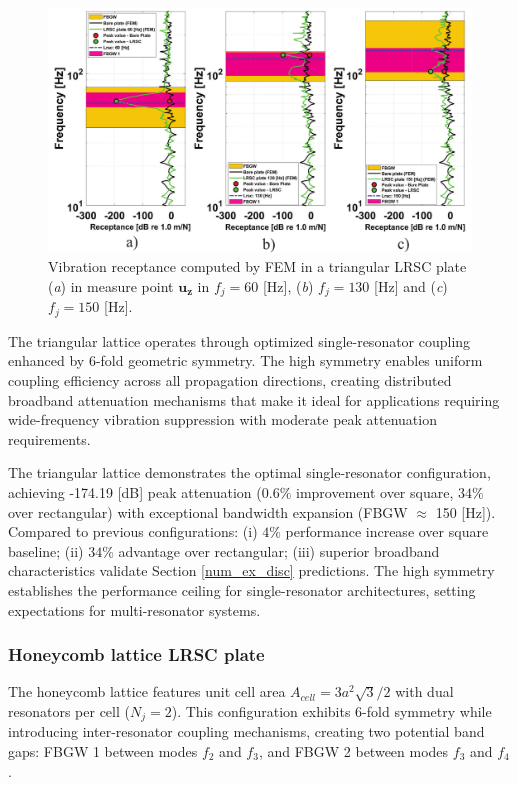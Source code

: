 \documentclass[review,numbers,sort&compress]{elsarticle}
\begin{document}
{\begin{figure}[htb]
	\centering
	\includegraphics[width=1.0\textwidth]{2_3_disp_frf_trian_3_receps.pdf}
	\caption{Vibration receptance computed by FEM in a triangular LRSC plate (\textit{a}) in measure point $\mathbf{u_z}$ in $f_j = 60$ [Hz], (\textit{b}) $f_j = 130$ [Hz] and (\textit{c}) $f_j = 150$ [Hz].}
	\label{lat_t_tr_frf_f1_f2_f3}
\end{figure}

The triangular lattice operates through optimized single-resonator coupling enhanced by 6-fold geometric symmetry. The high symmetry enables uniform coupling efficiency across all propagation directions, creating distributed broadband attenuation mechanisms that make it ideal for applications requiring wide-frequency vibration suppression with moderate peak attenuation requirements.

The triangular lattice demonstrates the optimal single-resonator configuration, achieving -174.19 [dB] peak attenuation ($0.6\%$ improvement over square, $34\%$ over rectangular) with exceptional bandwidth expansion (FBGW $\approx$ 150 [Hz]). Compared to previous configurations: (i) $4\%$ performance increase over square baseline; (ii) $34\%$ advantage over rectangular; (iii) superior broadband characteristics validate Section \ref{num_ex_disc} predictions. The high symmetry establishes the performance ceiling for single-resonator architectures, setting expectations for multi-resonator systems.

\subsubsection{Honeycomb lattice LRSC plate}\label{panel_lat_h}

The honeycomb lattice features unit cell area $A_{cell} = 3a^2\sqrt{3}/2$ with dual resonators per cell ($N_j = 2$). This configuration exhibits 6-fold symmetry while introducing inter-resonator coupling mechanisms, creating two potential band gaps: FBGW 1 between modes $f_2$ and $f_3$, and FBGW 2 between modes $f_3$ and $f_4$.

}
\end{document}

